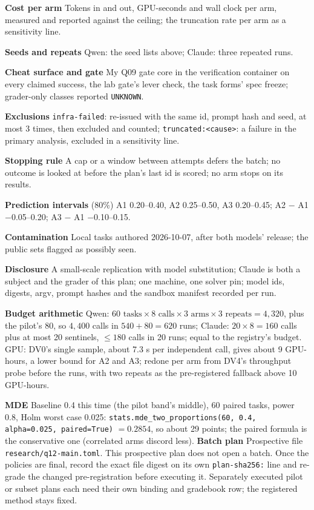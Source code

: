 \documentclass[11pt]{article}
\begin{document}
\begin{answer}
\textbf{Cost per arm} Tokens in and out, GPU-seconds and wall clock per arm, measured
and reported against the ceiling; the truncation rate per arm as a sensitivity line.

\textbf{Seeds and repeats} Qwen: the seed lists above; Claude: three repeated runs.

\textbf{Cheat surface and gate} My Q09 gate core in the verification container on every
claimed success, the lab gate's lever check, the task forms' spec freeze; grader-only
classes reported \texttt{UNKNOWN}.

\textbf{Exclusions} \texttt{infra-failed}: re-issued with the same id, prompt hash and
seed, at most 3 times, then excluded and counted; \texttt{truncated:<cause>}: a failure
in the primary analysis, excluded in a sensitivity line.

\textbf{Stopping rule} A cap or a window between attempts defers the batch; no outcome
is looked at before the plan's last id is scored; no arm stops on its results.

\textbf{Prediction intervals} (80\%) A1 0.20--0.40, A2 0.25--0.50, A3 0.20--0.45;
A2 $-$ A1 $-$0.05--0.20; A3 $-$ A1 $-$0.10--0.15.

\textbf{Contamination} Local tasks authored 2026-10-07, after both models' release;
the public sets flagged as possibly seen.

\textbf{Disclosure} A small-scale replication with model substitution; Claude is both a
subject and the grader of this plan; one machine, one solver pin; model ids, digests,
argv, prompt hashes and the sandbox manifest recorded per run.

\textbf{Budget arithmetic} Qwen: $60 \text{ tasks} \times 8 \text{ calls} \times 3
\text{ arms} \times 3 \text{ repeats} = 4{,}320$, plus the pilot's $80$, so $4{,}400$
calls in $540 + 80 = 620$ runs; Claude: $20 \times 8 = 160$ calls plus at most 20
sentinels, $\le 180$ calls in 20 runs; equal to the registry's budget. GPU: DV0's single
sample, about 7.3 s per independent call, gives about 9 GPU-hours, a lower bound for A2
and A3; redone per arm from DV4's throughput probe before the runs, with two repeats as
the pre-registered fallback above 10 GPU-hours.

\textbf{MDE} Baseline 0.4 this time (the pilot band's middle), 60 paired tasks, power
0.8, Holm worst case 0.025:
\texttt{stats.mde\_two\_proportions(60, 0.4, alpha=0.025, paired=True)} $= 0.2854$, so
about 29 points; the paired formula is the conservative one (correlated arms discord
less).
\textbf{Batch plan} Prospective file \texttt{research/q12-main.toml}.
This prospective plan does not open a batch. Once the policies are final,
record the exact file digest on its own \texttt{plan-sha256:} line and
re-grade the changed pre-registration before executing it. Separately
executed pilot or subset plans each need their own binding and gradebook
row; the registered method stays fixed.
\end{answer}
\end{document}
